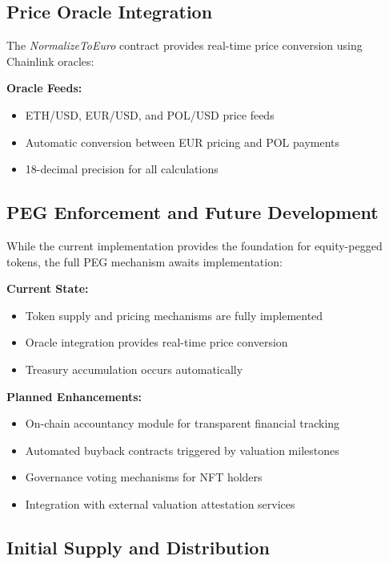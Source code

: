 \documentclass[conference]{IEEEtran}
\begin{document}
\subsection{Price Oracle Integration}

The \textit{NormalizeToEuro} contract provides real-time price conversion using Chainlink oracles:

\textbf{Oracle Feeds:}
\begin{itemize}
    \item ETH/USD, EUR/USD, and POL/USD price feeds
    \item Automatic conversion between EUR pricing and POL payments
    \item 18-decimal precision for all calculations
\end{itemize}

\subsection{PEG Enforcement and Future Development}

While the current implementation provides the foundation for equity-pegged tokens, the full PEG mechanism awaits implementation:

\textbf{Current State:}
\begin{itemize}
    \item Token supply and pricing mechanisms are fully implemented
    \item Oracle integration provides real-time price conversion
    \item Treasury accumulation occurs automatically
\end{itemize}

\textbf{Planned Enhancements:}
\begin{itemize}
    \item On-chain accountancy module for transparent financial tracking
    \item Automated buyback contracts triggered by valuation milestones
    \item Governance voting mechanisms for NFT holders
    \item Integration with external valuation attestation services
\end{itemize}

\subsection{Initial Supply and Distribution}
\end{document}
